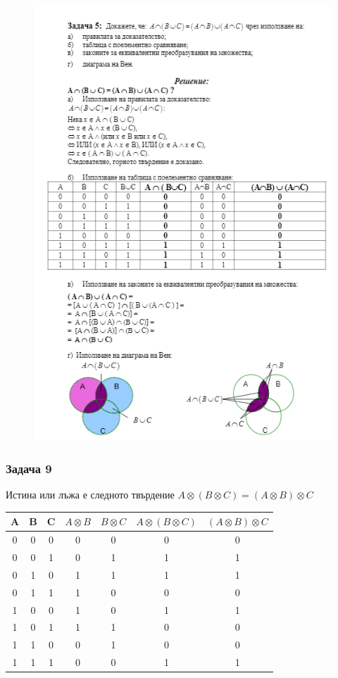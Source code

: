 \documentclass[fleqn, 12pt]{article}
\theoremstyle{definition}
\begin{document}
\newpage
\begin{figure}[htp!]
\includegraphics{Pics/Discrete math/ex3/ex3-task5.png}
\end{figure}

\newpage
\subsubsection*{Задача 9}
Истина или лъжа е следното твърдение $A \otimes (B \otimes C) = (A \otimes B) \otimes C$
\begin{table}[htp]
\begin{center}
\begin{tabular}{|c|c|c|c|c|c|c|} 
\hline
 A & B & C  & $A \otimes B$ & $B \otimes C$ & $A \otimes (B \otimes C)$ & $(A \otimes B) \otimes C$  \\
\hline
0 & 0 & 0 & 0 & 0 & 0 & 0 \\
\hline
0 & 0 & 1 & 0 & 1 & 1 & 1 \\
\hline
0 & 1 & 0 & 1 & 1 & 1 & 1 \\
\hline
0 & 1 & 1 & 1 & 0 & 0 & 0 \\
\hline
1 & 0 & 0 & 1 & 0 & 1 & 1 \\
\hline
1 & 0 & 1 & 1 & 1 & 0 & 0 \\
\hline
1 & 1 & 0 & 0 & 1 & 0 & 0 \\
\hline
1 & 1 & 1 & 0 & 0 & 1 & 1 \\
\hline
\end{tabular}
\end{center}
\end{table}
\newpage
\end{document}
